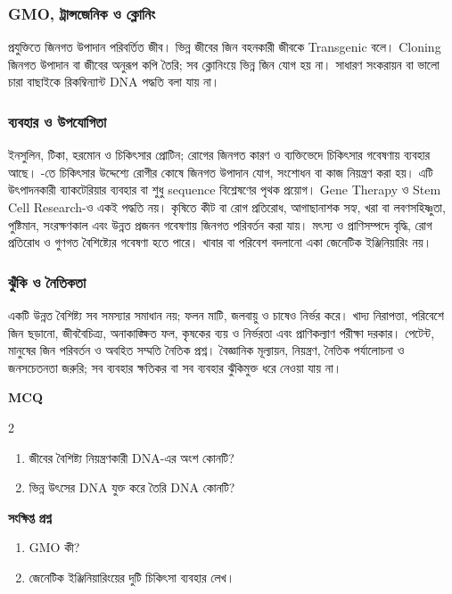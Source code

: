 \subsubsection{GMO, ট্রান্সজেনিক ও ক্লোনিং}
 প্রযুক্তিতে জিনগত উপাদান পরিবর্তিত জীব। ভিন্ন জীবের জিন বহনকারী জীবকে Transgenic বলে। Cloning জিনগত উপাদান বা জীবের অনুরূপ কপি তৈরি; সব ক্লোনিংয়ে ভিন্ন জিন যোগ হয় না। সাধারণ সংকরায়ন বা ভালো চারা বাছাইকে রিকম্বিন্যান্ট DNA পদ্ধতি বলা যায় না।
\subsubsection{ব্যবহার ও উপযোগিতা}
ইনসুলিন, টিকা, হরমোন ও চিকিৎসার প্রোটিন; রোগের জিনগত কারণ ও ব্যক্তিভেদে চিকিৎসার গবেষণায় ব্যবহার আছে। -তে চিকিৎসার উদ্দেশ্যে রোগীর কোষে জিনগত উপাদান যোগ, সংশোধন বা কাজ নিয়ন্ত্রণ করা হয়। এটি উৎপাদনকারী ব্যাকটেরিয়ার ব্যবহার বা শুধু sequence বিশ্লেষণের পৃথক প্রয়োগ। Gene Therapy ও Stem Cell Research-ও একই পদ্ধতি নয়।
কৃষিতে কীট বা রোগ প্রতিরোধ, আগাছানাশক সহ্য, খরা বা লবণসহিষ্ণুতা, পুষ্টিমান, সংরক্ষণকাল এবং উন্নত প্রজনন গবেষণায় জিনগত পরিবর্তন করা যায়। মৎস্য ও প্রাণিসম্পদে বৃদ্ধি, রোগ প্রতিরোধ ও গুণগত বৈশিষ্ট্যের গবেষণা হতে পারে। খাবার বা পরিবেশ বদলানো একা জেনেটিক ইঞ্জিনিয়ারিং নয়।
\subsubsection{ঝুঁকি ও নৈতিকতা}
একটি উন্নত বৈশিষ্ট্য সব সমস্যার সমাধান নয়; ফলন মাটি, জলবায়ু ও চাষেও নির্ভর করে। খাদ্য নিরাপত্তা, পরিবেশে জিন ছড়ানো, জীববৈচিত্র্য, অনাকাঙ্ক্ষিত ফল, কৃষকের ব্যয় ও নির্ভরতা এবং প্রাণিকল্যাণ পরীক্ষা দরকার। পেটেন্ট, মানুষের জিন পরিবর্তন ও অবহিত সম্মতি নৈতিক প্রশ্ন। বৈজ্ঞানিক মূল্যায়ন, নিয়ন্ত্রণ, নৈতিক পর্যালোচনা ও জনসচেতনতা জরুরি; সব ব্যবহার ক্ষতিকর বা সব ব্যবহার ঝুঁকিমুক্ত ধরে নেওয়া যায় না।
\begin{practicebox}
\textbf{MCQ}
\begin{multicols}{2}\begin{enumerate}
\item \begin{minipage}[t]{\linewidth}জীবের বৈশিষ্ট্য নিয়ন্ত্রণকারী DNA-এর অংশ কোনটি?\par {}\par\end{minipage}
\item \begin{minipage}[t]{\linewidth}ভিন্ন উৎসের DNA যুক্ত করে তৈরি DNA কোনটি?\par {}\par\end{minipage}
\end{enumerate}\end{multicols}

\textbf{সংক্ষিপ্ত প্রশ্ন}
\begin{enumerate}
\item GMO কী?
\item জেনেটিক ইঞ্জিনিয়ারিংয়ের দুটি চিকিৎসা ব্যবহার লেখ।
\end{enumerate}
\end{practicebox}

